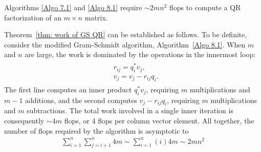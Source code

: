 \begin{theorem}
\label{thm: work of GS QR}
Algorithms \ref{Algo 7.1} and \ref{Algo 8.1} require $\sim 2mn^2$ flops to compute a QR factorization of an $m\times n$ matrix. 
\end{theorem}
Theorem~\ref{thm: work of GS QR} can be established as follows. To be definite, consider the modified Gram-Schmidt algorithm, Algorithm~\ref{Algo 8.1}. When $m$ and $n$ are large, the work is dominated by the operations in the innermost loop:
\begin{align*}
\begin{aligned}
& r_{i j}=q_i^* v_j, \\
& v_j=v_j-r_{i j} q_i .
\end{aligned}
\end{align*}
The first line computes an inner product $q_i^* v_j$, requiring $m$ multiplications and $m-1$ additions, and the second computes $v_j-r_{i j} q_i$, requiring $m$ multiplications and $m$ subtractions. The total work involved in a single inner iteration is consequently $\sim 4 m$ flops, or 4 flops per column vector element. All together, the number of flops required by the algorithm is asymptotic to
\begin{align*}
\sum_{i=1}^n \sum_{j=i+1}^n 4 m \sim \sum_{i=1}^n(i) 4 m \sim 2 m n^2
\end{align*}

